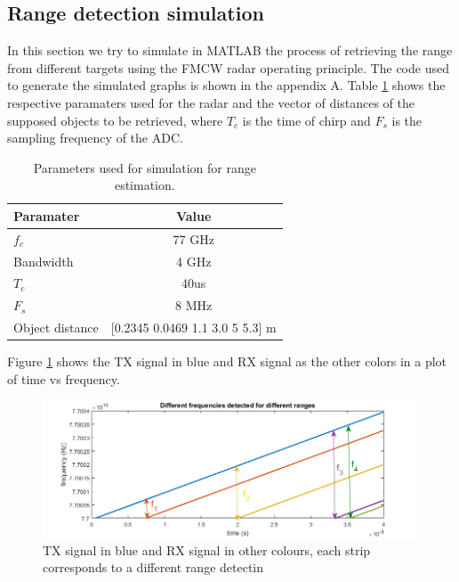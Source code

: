 \subsection{Range detection simulation}
In this section we try to simulate in MATLAB the process of retrieving the range from different targets using the \ac{FMCW} \ac{radar} operating principle. The code used to generate the simulated graphs is shown in the appendix A. Table \ref{tab:table1} shows the respective paramaters used for the radar and the vector of distances of the supposed objects to be retrieved, where $T_c$ is the time of chirp and $F_s$ is the sampling frequency of the \ac{ADC}.
\begin{table}[ht!]
  \begin{center}
    \caption{Parameters used for simulation for range estimation.}
    \label{tab:table1}
    \begin{tabular}{l|c} %
      \textbf{Paramater} & \textbf{Value } \\
      \hline
      $f_c$ & 77 GHz \\
      Bandwidth & 4 GHz \\
      $T_c$ & 40us \\
      $F_s$ & 8 MHz \\
      Object distance & [0.2345 0.0469 1.1 3.0 5 5.3]  m
    \end{tabular}
  \end{center}
\end{table}
 Figure \ref{fig:if2} shows the TX signal in blue and RX signal as the other colors in a plot of time vs frequency.
 \begin{figure}[h] 
\centerline{\includegraphics [width=1.0 \textwidth]{imgs/chapter2/SimFrequencies.png}}
\caption[Demonstration of the TX signal in blue and RX signal in other colours]{TX signal in blue and RX signal in other colours, each strip corresponds to a different range detectin}
\label{fig:if2}
\end{figure}
